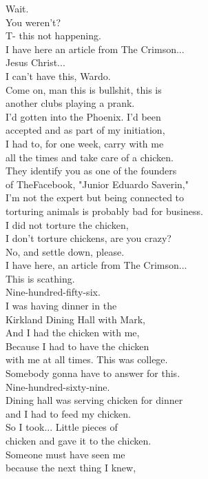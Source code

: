 \documentclass{article}
\begin{document}
\begin{multicols}{3}
Wait.\\
You weren't?\\
T- this not happening.\\
I have here an article from The Crimson...\\
Jesus Christ...\\
I can't have this, Wardo.\\
Come on, man this is bullshit, this is\\
another clubs playing a prank.\\
I'd gotten into the Phoenix. I'd been\\
accepted and as part of my initiation,\\
I had to, for one week, carry with me\\
all the times and take care of a chicken.\\
They identify you as one of the founders\\
of TheFacebook, "Junior Eduardo Saverin,"\\
I'm not the expert but being connected to\\
torturing animals is probably bad for business.\\
I did not torture the chicken,\\
I don't torture chickens, are you crazy?\\
No, and settle down, please.\\
I have here, an article from The Crimson...\\
This is scathing.\\
Nine-hundred-fifty-six.\\
I was having dinner in the\\
Kirkland Dining Hall with Mark,\\
And I had the chicken with me,\\
Because I had to have the chicken\\
with me at all times. This was college.\\
Somebody gonna have to answer for this.\\
Nine-hundred-sixty-nine.\\
Dining hall was serving chicken for dinner\\
and I had to feed my chicken.\\
So I took... Little pieces of\\
chicken and gave it to the chicken.\\
Someone must have seen me\\
because the next thing I knew,\\

\end{multicols}
\end{document}
